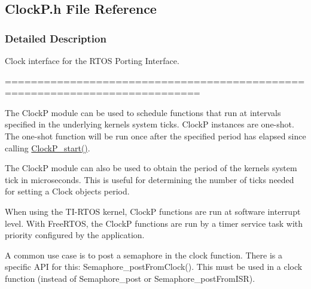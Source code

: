 \subsection{Clock\+P.\+h File Reference}
\label{_clock_p_8h}


\subsubsection{Detailed Description}
Clock interface for the R\+T\+O\+S Porting Interface. 

============================================================================

The Clock\+P module can be used to schedule functions that run at intervals specified in the underlying kernel\textquotesingle{}s system ticks. Clock\+P instances are one-\/shot. The one-\/shot function will be run once after the specified period has elapsed since calling \hyperlink{_clock_p_8h_a72fe821307efbdb0e314108857e39e56}{Clock\+P\+\_\+start()}.

The Clock\+P module can also be used to obtain the period of the kernel\textquotesingle{}s system tick in microseconds. This is useful for determining the number of ticks needed for setting a Clock object\textquotesingle{}s period.

When using the T\+I-\/\+R\+T\+O\+S kernel, Clock\+P functions are run at software interrupt level. With Free\+R\+T\+O\+S, the Clock\+P functions are run by a timer service task with priority configured by the application.

A common use case is to post a semaphore in the clock function. There is a specific A\+P\+I for this\+: Semaphore\+\_\+post\+From\+Clock(). This must be used in a clock function (instead of Semaphore\+\_\+post or Semaphore\+\_\+post\+From\+I\+S\+R). 

